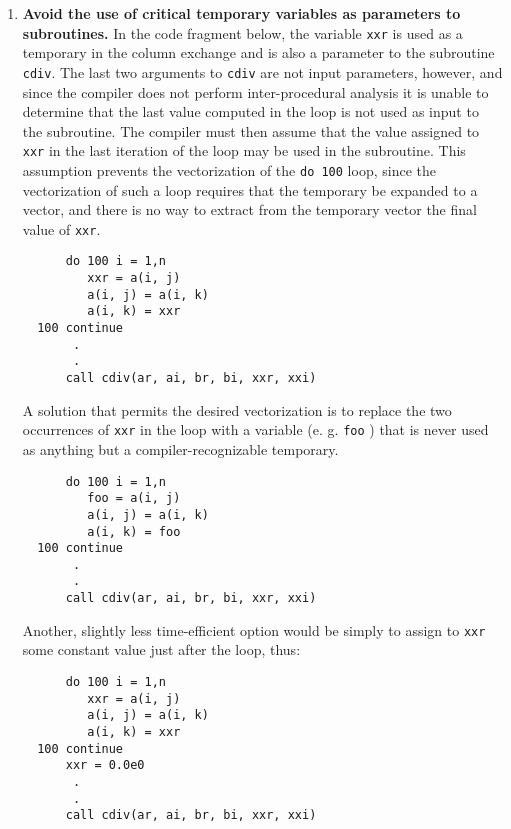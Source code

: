\begin{enumerate}
 \item {\bf Avoid the use of critical temporary variables as parameters to
     subroutines.}
In the code fragment below, the variable {\tt xxr} is used as a
temporary in the column exchange and is also a parameter to the subroutine
{\tt cdiv}.  The last two arguments to {\tt cdiv} are not input parameters,
however, and since the compiler does not perform inter-procedural analysis
it is unable to determine that the last value computed in the loop is
not used as input to the subroutine.  The compiler must then assume that the
value assigned to {\tt xxr} in the last iteration of the loop may be used in
the subroutine.  This assumption prevents
the vectorization of the {\tt do 100} loop, since the vectorization of such
a loop requires that the temporary be expanded to a vector, and there is no
way to extract from the temporary vector the final value of {\tt xxr}.

\begin{verbatim}
      do 100 i = 1,n
         xxr = a(i, j)
         a(i, j) = a(i, k)
         a(i, k) = xxr
  100 continue
       .
       .
      call cdiv(ar, ai, br, bi, xxr, xxi)
\end{verbatim}

A solution that permits the desired vectorization
is to replace the two occurrences of {\tt xxr} in the loop with a variable
(e. g. {\tt foo} ) that is never used as anything but a compiler-recognizable
temporary.

\begin{verbatim}
      do 100 i = 1,n
         foo = a(i, j)
         a(i, j) = a(i, k)
         a(i, k) = foo
  100 continue
       .
       .
      call cdiv(ar, ai, br, bi, xxr, xxi)
\end{verbatim}

Another, slightly less time-efficient option would be simply to assign to
{\tt xxr} some constant value just after the loop, thus:

\begin{verbatim}
      do 100 i = 1,n
         xxr = a(i, j)
         a(i, j) = a(i, k)
         a(i, k) = xxr
  100 continue
      xxr = 0.0e0
       .
       .
      call cdiv(ar, ai, br, bi, xxr, xxi)
\end{verbatim}


\end{enumerate}
